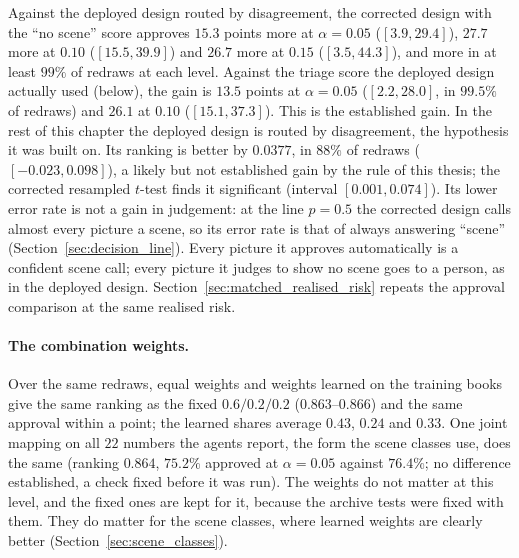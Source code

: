 Against the deployed design routed by disagreement, the corrected design with the ``no scene'' score approves $15.3$ points more at $\alpha = 0.05$ ($[3.9, 29.4]$), $27.7$ more at $0.10$ ($[15.5, 39.9]$) and $26.7$ more at $0.15$ ($[3.5, 44.3]$), and more in at least $99\%$ of redraws at each level. Against the triage score the deployed design actually used (below), the gain is $13.5$ points at $\alpha=0.05$ ($[2.2, 28.0]$, in $99.5\%$ of redraws) and $26.1$ at $0.10$ ($[15.1, 37.3]$). This is the established gain. In the rest of this chapter the deployed design is routed by disagreement, the hypothesis it was built on. Its ranking is better by $0.0377$, in $88\%$ of redraws ($[-0.023, 0.098]$), a likely but not established gain by the rule of this thesis; the corrected resampled $t$-test finds it significant (interval $[0.001, 0.074]$). Its lower error rate is not a gain in judgement: at the line $p = 0.5$ the corrected design calls almost every picture a scene, so its error rate is that of always answering ``scene'' (Section~\ref{sec:decision_line}). Every picture it approves automatically is a confident scene call; every picture it judges to show no scene goes to a person, as in the deployed design. Section~\ref{sec:matched_realised_risk} repeats the approval comparison at the same realised risk.

\paragraph{The combination weights.} Over the same redraws, equal weights and weights learned on the training books give the same ranking as the fixed $0.6/0.2/0.2$ ($0.863$--$0.866$) and the same approval within a point; the learned shares average $0.43$, $0.24$ and $0.33$. One joint mapping on all $22$ numbers the agents report, the form the scene classes use, does the same (ranking $0.864$, $75.2\%$ approved at $\alpha=0.05$ against $76.4\%$; no difference established, a check fixed before it was run). The weights do not matter at this level, and the fixed ones are kept for it, because the archive tests were fixed with them. They do matter for the scene classes, where learned weights are clearly better (Section~\ref{sec:scene_classes}).

